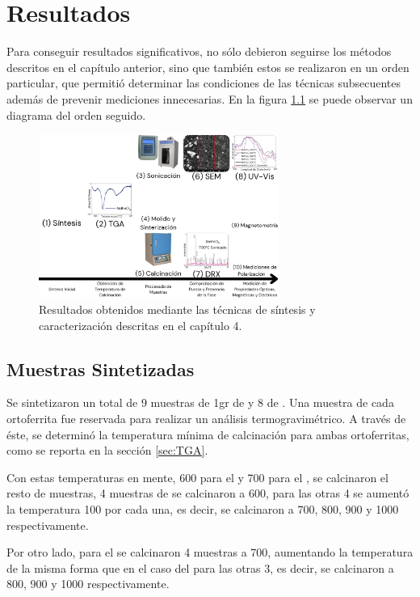 \documentclass[../main.tex]{subfiles}
\begin{document}
\chapter{Resultados}
Para conseguir resultados significativos, no sólo debieron seguirse los métodos descritos en el capítulo anterior, sino que también estos se realizaron en un orden particular, que permitió determinar las condiciones de las técnicas subsecuentes además de prevenir mediciones innecesarias. En la figura \ref{fig:resdiag} se puede observar un diagrama del orden seguido.
\begin{figure}[H]
    \centering
    \includegraphics[width=0.7\textwidth]{fig/diagresultados.png}
    \caption{Resultados obtenidos mediante las técnicas de síntesis y caracterización descritas en el capítulo 4.}
    \label{fig:resdiag}
\end{figure}
\section{Muestras Sintetizadas} \label{sec:sintesis}
Se sintetizaron un total de 9 muestras de 1gr de \neod{} y 8 de \sama{}. Una muestra de cada ortoferrita fue reservada para realizar un análisis termogravimétrico. A través de éste, se determinó la temperatura mínima de calcinación para ambas ortoferritas, como se reporta en la sección \ref{sec:TGA}.

Con estas temperaturas en mente, 600\gradoC{} para el \neod{} y 700\gradoC{} para el \sama{}, se calcinaron el resto de muestras, 4 muestras de \neod{} se calcinaron a 600\gradoC{}, para las otras 4 se aumentó la temperatura 100\gradoC{} por cada una, es decir, se calcinaron a 700, 800, 900 y 1000\gradoC{} respectivamente.

Por otro lado, para el \sama{} se calcinaron 4 muestras a 700\gradoC{}, aumentando la temperatura de la misma forma que en el caso del \neod{} para las otras 3, es decir, se calcinaron a 800, 900 y 1000\gradoC{} respectivamente.
\end{document}
